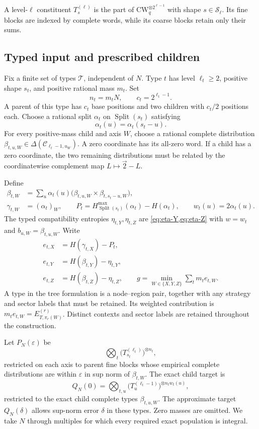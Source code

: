 \documentclass[11pt,a4paper]{article}
\newcommand{\CW}{\mathrm{CW}}
\newcommand{\Shapes}{\mathcal S}
\DeclareMathOperator{\Split}{Split}
\newcommand{\WW}{\{X,Y,Z\}}
\begin{document}
A level-$\ell$ constituent $T_s^{(\ell)}$ is the part of $\CW_q^{\otimes 2^{\ell-1}}$ with shape $s\in\Shapes_\ell$. Its fine blocks are indexed by complete words, while its coarse blocks retain only their sums.

\subsection{Typed input and prescribed children}

Fix a finite set of types $\mathcal T$, independent of $N$. Type $t$ has level $\ell_t\ge2$, positive shape $s_t$, and positive rational mass $m_t$. Set
\[
n_t=m_tN,\qquad c_t=2^{\ell_t-1}.
\]
A parent of this type has $c_t$ base positions and two children with $c_t/2$ positions each. Choose a rational split $\alpha_t$ on $\Split(s_t)$ satisfying
\[
\alpha_t(u)=\alpha_t(s_t-u).
\]
For every positive-mass child and axis $W$, choose a rational complete distribution
$\beta_{t,u,W}\in\Delta(\mathcal C_{\ell_t-1,u_W})$. A zero coordinate has its all-zero word. If a child has a zero coordinate, the two remaining distributions must be related by the coordinatewise complement map $L\mapsto\vec2-L$.

Define
\begin{align}
\beta_{t,W}&=\sum_u\alpha_t(u)
   \bigl(\beta_{t,u,W}\times\beta_{t,s_t-u,W}\bigr),\label{eq:typed-beta}\\
\gamma_{t,W}&=(\alpha_t)_W,\qquad
P_t=H^{\max}_{\Split(s_t)}(\alpha_t)-H(\alpha_t),\qquad
w_t(u)=2\alpha_t(u).
\end{align}
The typed compatibility entropies $\eta_{t,Y},\eta_{t,Z}$ are \cref{eq:eta-Y,eq:eta-Z} with $w=w_t$ and $b_{u,W}=\beta_{t,u,W}$. Write
\begin{equation}\label{eq:typed-rates}
\begin{aligned}
e_{t,X}&=H(\gamma_{t,X})-P_t,\\
e_{t,Y}&=H(\beta_{t,Y})-\eta_{t,Y},\\
e_{t,Z}&=H(\beta_{t,Z})-\eta_{t,Z},
\qquad g=\min_{W\in\WW}\sum_t m_t e_{t,W}.
\end{aligned}
\end{equation}
A type in the tree formulation is a node--region pair, together with any strategy and sector labels that must be retained. Its weighted contribution is $m_te_{t,W}=E_{T,\pi_r(W)}^{(r)}$. Distinct contexts and sector labels are retained throughout the construction.

Let $P_N(\varepsilon)$ be
\[
\bigotimes_t\bigl(T_{s_t}^{(\ell_t)}\bigr)^{\otimes n_t},
\]
restricted on each axis to parent fine blocks whose empirical complete distributions are within $\varepsilon$ in sup norm of $\beta_{t,W}$. The exact child target is
\[
Q_N(0)=\bigotimes_{t,u}\bigl(T_u^{(\ell_t-1)}\bigr)^{\otimes n_tw_t(u)},
\]
restricted to the exact child complete types $\beta_{t,u,W}$. The approximate target $Q_N(\delta)$ allows sup-norm error $\delta$ in these types. Zero masses are omitted. We take $N$ through multiples for which every required exact population is integral.
\end{document}
